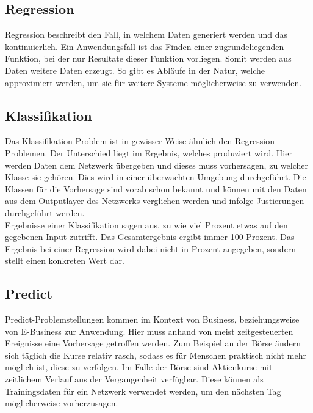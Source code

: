 \subsection{Regression}
\label{subsec:Regression}

Regression beschreibt den Fall, in welchem Daten generiert werden und das kontinuierlich.
Ein Anwendungsfall ist das Finden einer zugrundeliegenden Funktion, bei der nur Resultate dieser Funktion vorliegen. 
Somit werden aus Daten weitere Daten erzeugt.
So gibt es Abläufe in der Natur, welche approximiert werden, um sie für weitere Systeme möglicherweise zu verwenden. \cite{bishop2006pattern}

\subsection{Klassifikation}
\label{subsec:Classification}

Das Klassifikation-Problem ist in gewisser Weise ähnlich den Regression-Problemen. 
Der Unterschied liegt im Ergebnis, welches produziert wird.  
Hier werden Daten dem Netzwerk übergeben und dieses muss vorhersagen, zu welcher Klasse sie gehören. Dies wird in einer überwachten Umgebung durchgeführt. 
Die Klassen für die Vorhersage sind vorab schon bekannt und können mit den Daten aus dem Outputlayer des Netzwerks verglichen werden und infolge Justierungen durchgeführt werden. \cite{AI3} \\

\noindent
Ergebnisse einer Klassifikation sagen aus, zu wie viel Prozent etwas auf den gegebenen Input zutrifft. 
Das Gesamtergebnis ergibt immer 100 Prozent. 
Das Ergebnis bei einer Regression wird dabei nicht in Prozent angegeben, sondern stellt einen konkreten Wert dar.

\subsection{Predict}
\label{subsec:Predict}

Predict-Problemstellungen kommen im Kontext von Business, beziehungsweise von E-Business zur Anwendung. 
Hier muss anhand von meist zeitgesteuerten Ereignisse eine Vorhersage getroffen werden. 
Zum Beispiel an der Börse ändern sich täglich die Kurse relativ rasch, sodass es für Menschen praktisch nicht mehr möglich ist, diese zu verfolgen. 
Im Falle der Börse sind Aktienkurse mit zeitlichem Verlauf aus der Vergangenheit verfügbar. 
Diese können als Trainingsdaten für ein Netzwerk verwendet werden, um den nächsten Tag möglicherweise vorherzusagen. 

